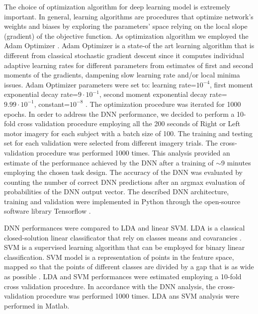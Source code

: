 \documentclass[12pt ]{iopart}
\begin{document}
 The choice of optimization algorithm for deep learning model is extremely important.
 In general, learning algorithms are procedures that optimize network's weights and biases by exploring the parameters' space relying  on the local  slope (gradient) of the objective function.  
 As optimization algorithm we employed the Adam Optimizer \parencite{kingma2014adam}.
Adam Optimizer is a state-of the art learning algorithm that is different from classical stochastic gradient descent since it computes individual adaptive learning rates for different parameters from estimates of first and second moments of the gradients, dampening slow learning rate and/or local minima issues.
Adam Optimizer parameters were set to: learning rate=$10^{-4}$, first moment exponential decay rate=$9\cdot 10^{-1}$,  second moment exponential decay rate=$9.99\cdot 10^{-1}$, constant=$10^{-8}$ \parencite{kingma2014adam}.
The optimization procedure was iterated for 1000 epochs.
In order to address the DNN performance, we decided to perform a 10-fold cross validation procedure \parencite{kohavi1995study} employing all the 200 seconds of Right or Left motor imagery for each subject with a batch size of 100. 
The training and testing set for each validation were selected from different imagery trials.
The cross-validation procedure was performed 1000 times. 
This analysis provided an estimate of the performance achieved by the DNN after a training of $\sim$9 minutes employing the chosen task design. 
The accuracy of the DNN was evaluated by counting the number of correct DNN predictions after an argmax evaluation of probabilities of the DNN output vector.
The described DNN architecture, training and validation were implemented in Python  through the open-source software library Tensorflow \parencite{abadi2016tensorflow}.

DNN performances were compared to LDA and linear SVM.
LDA is a classical closed-solution linear classificator that rely on classes means and covarancies \parencite{balakrishnama1998linear}.
SVM is a supervised learning algorithm that can be employed for binary linear classification. SVM model is a representation of  points in the feature space, mapped so that the points of different classes are divided by a gap that is as wide as possible \parencite{cortes1995support}.
LDA and SVM performances were estimated employing  a 10-fold cross validation procedure. In accordance with the DNN analysis,  the cross-validation procedure was performed 1000 times. 
LDA ans SVM analysis were performed in Matlab.
\end{document}
